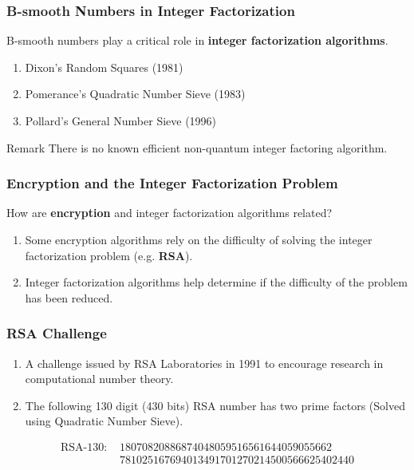 \documentclass[11pt,xcolor={dvipsnames}]{beamer}
\begin{document}
\begin{frame}
	\frametitle{B-smooth Numbers in Integer Factorization}
	B-smooth numbers play a critical role in \textbf{integer factorization algorithms}.
	\begin{enumerate}
		\item Dixon's Random Squares (1981)
		\item Pomerance's Quadratic Number Sieve (1983)
		\item Pollard's General Number Sieve (1996)
	\end{enumerate}

	\begin{alertblock}{Remark}
		There is no known efficient non-quantum integer factoring algorithm.
	\end{alertblock}
\end{frame}

\begin{frame}
	\frametitle{Encryption and the Integer Factorization Problem}
	How are \textbf{encryption} and integer factorization algorithms related?
	\begin{enumerate}
		\item Some encryption algorithms rely on the difficulty of solving the integer factorization problem (e.g. \textbf{RSA}).
		\item Integer factorization algorithms help determine if the difficulty of the problem has been reduced.
	\end{enumerate}
\end{frame}

\begin{frame}
	\frametitle{RSA Challenge}
	\begin{enumerate}
		\item A challenge issued by RSA Laboratories in 1991 to encourage research in computational number theory.
	
		\item The following 130 digit (430 bits) RSA number  has two prime factors (Solved using Quadratic Number Sieve).
	\end{enumerate}
	\begin{example}
		 \begin{align*}
			\text{RSA-}130\text{: } &18070820886874048059516561644059055662\\
			&781025167694013491701270214500566625402440
		\end{align*}
	\end{example}

\end{frame}
\end{document}
